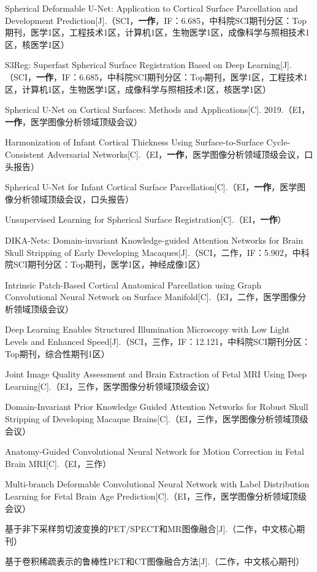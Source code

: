 \cleardoublepage
{}


\noindent [1] Spherical Deformable U-Net: Application to Cortical Surface Parcellation and Development Prediction[J].（SCI，\textbf{一作}，IF：6.685，中科院SCI期刊分区：Top期刊，医学1区，工程技术1区，计算机1区，生物医学1区，成像科学与照相技术1区，核医学1区）

\noindent [2] S3Reg: Superfast Spherical Surface Registration Based on Deep Learning[J].（SCI，\textbf{一作}，IF：6.685，中科院SCI期刊分区：Top期刊，医学1区，工程技术1区，计算机1区，生物医学1区，成像科学与照相技术1区，核医学1区）

\noindent [3] Spherical U-Net on Cortical Surfaces: Methods and Applications[C]. 2019.（EI，\textbf{一作}，医学图像分析领域顶级会议）

\noindent [4] Harmonization of Infant Cortical Thickness Using Surface-to-Surface Cycle-Consistent Adversarial Networks[C].（EI，\textbf{一作}，医学图像分析领域顶级会议，口头报告）

\noindent [5] Spherical U-Net for Infant Cortical Surface Parcellation[C].（EI，\textbf{一作}，医学图像分析领域顶级会议，口头报告）

\noindent [6] Unsupervised Learning for Spherical Surface Registration[C].（EI，\textbf{一作}）

\noindent [7] DIKA-Nets: Domain-invariant Knowledge-guided Attention Networks for Brain Skull Stripping of Early Developing Macaques[J].（SCI，二作，IF：5.902，中科院SCI期刊分区：Top期刊，医学1区，神经成像1区） 

\noindent [8] Intrinsic Patch-Based Cortical Anatomical Parcellation using Graph Convolutional Neural Network on Surface Manifold[C].（EI，二作，医学图像分析领域顶级会议）

\noindent [9] Deep Learning Enables Structured Illumination Microscopy with Low Light Levels and Enhanced Speed[J].（SCI，三作，IF：12.121，中科院SCI期刊分区：Top期刊，综合性期刊1区）

\noindent [10] Joint Image Quality Assessment and Brain Extraction of Fetal MRI Using Deep Learning[C].（EI，三作，医学图像分析领域顶级会议）

\noindent [11] Domain-Invariant Prior Knowledge Guided Attention Networks for Robust Skull Stripping of Developing Macaque Brains[C].（EI，三作，医学图像分析领域顶级会议）

\noindent [12] Anatomy-Guided Convolutional Neural Network for Motion Correction in Fetal Brain MRI[C].（EI，三作）

\noindent [13] Multi-branch Deformable Convolutional Neural Network with Label Distribution Learning for Fetal Brain Age Prediction[C].（EI，三作，医学图像分析领域顶级会议）

\noindent [14] 基于非下采样剪切波变换的PET/SPECT和MR图像融合[J].（二作，中文核心期刊）

\noindent [15] 基于卷积稀疏表示的鲁棒性PET和CT图像融合方法[J].（二作，中文核心期刊）